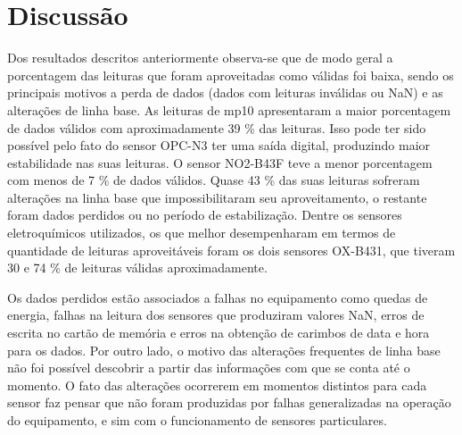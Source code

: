 











\section{Discussão}

Dos resultados descritos anteriormente observa-se que de modo geral a porcentagem das leituras que foram aproveitadas como válidas foi baixa, sendo os principais motivos a perda de dados (dados com leituras inválidas ou NaN) e as alterações de linha base. As leituras de \acrshort{mp10} apresentaram a maior porcentagem de dados válidos com aproximadamente 39 \% das leituras. Isso pode ter sido possível pelo fato do sensor OPC-N3 ter uma saída digital, produzindo maior estabilidade nas suas leituras. O sensor NO2-B43F teve a menor porcentagem com menos de 7 \% de dados válidos. Quase 43 \% das suas leituras sofreram alterações na linha base que impossibilitaram seu aproveitamento, o restante foram dados perdidos ou no período de estabilização. Dentre os sensores eletroquímicos utilizados, os que melhor desempenharam em termos de quantidade de leituras aproveitáveis foram os dois sensores OX-B431, que tiveram 30 e 74 \% de leituras válidas aproximadamente.

Os dados perdidos estão associados a falhas no equipamento como quedas de energia, falhas na leitura dos sensores que produziram valores NaN, erros de escrita no cartão de memória e erros na obtenção de carimbos de data e hora para os dados. Por outro lado, o motivo das alterações frequentes de linha base não foi possível descobrir a partir das informações com que se conta até o momento. O fato das alterações ocorrerem em momentos distintos para cada sensor faz pensar que não foram produzidas por falhas generalizadas na operação do equipamento, e sim com o funcionamento de sensores particulares.

